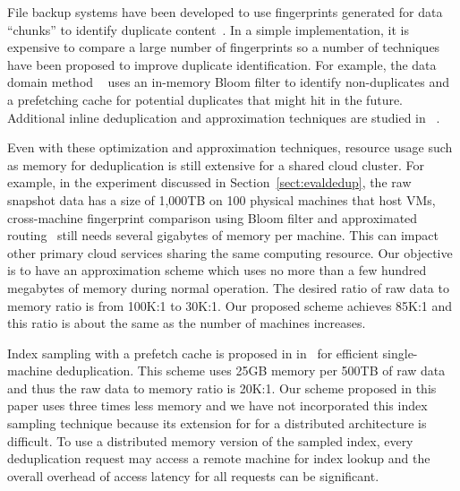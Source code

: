 File backup systems have been developed to use fingerprints generated for
data ``chunks''  to identify duplicate
content~\cite{venti02,Rhea2008}.  In a simple implementation,
it is expensive to compare a large number of 
fingerprints
so a number of techniques have been proposed to improve duplicate identification. 
For example, the data domain method ~\cite{bottleneck08} 
uses an in-memory Bloom filter to identify non-duplicates and a prefetching cache for potential
duplicates that might hit in the future.
Additional inline deduplication and  approximation techniques
are studied in ~\cite{extreme_binning09,sparseindex09,Srinivasan2012,WeiZhangIEEE}.  

Even with these optimization and approximation techniques, resource usage such as memory  for deduplication
is still extensive for a shared cloud cluster.  
For example, in the experiment discussed in Section~\ref{sect:evaldedup}, 
the raw snapshot data has a size of 1,000TB on 100 physical machines that host VMs,
cross-machine fingerprint comparison using Bloom filter and approximated routing~\cite{bottleneck08,Dong2011} 
still needs several gigabytes of memory per machine. This can impact other primary cloud services sharing the same
computing resource. Our objective is to have an approximation scheme 
which uses no more than a few hundred megabytes of memory during normal operation.
The desired ratio of raw data to memory ratio is from 100K:1 to 30K:1.
Our proposed scheme achieves 85K:1
and this ratio is about the same as the number of machines increases.

Index sampling with a prefetch cache  is proposed in
in~\cite{Guo2011} for efficient single-machine deduplication. 
This scheme uses 25GB memory per 500TB of raw data
and thus the raw data to memory ratio is 20K:1. Our scheme proposed in this paper 
uses three times less memory and we have not incorporated this index 
sampling technique because its extension for
for a distributed architecture is difficult.  To use a distributed memory version 
of the sampled index, every deduplication
request may access a remote machine for index lookup and the overall overhead 
of access latency for all requests can be significant.

